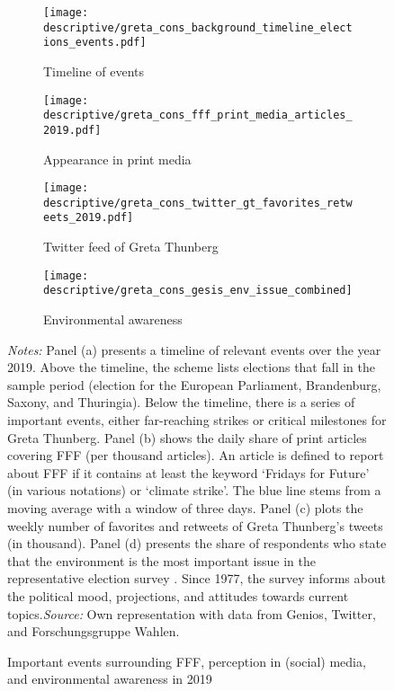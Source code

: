 \begin{landscape}
	\vspace*{\fill}
	\begin{figure}[H]\centering
		\begin{subfigure}[h]{0.85\linewidth}\centering\caption{Timeline of events}\centering
			\texttt{[image: descriptive/greta\_cons\_background\_timeline\_elections\_events.pdf]}
		\end{subfigure}
		
		\par\smallskip %
		\begin{subfigure}[h]{0.29\linewidth}\centering\caption{Appearance in print media}
			\texttt{[image: descriptive/greta\_cons\_fff\_print\_media\_articles\_2019.pdf]}
		\end{subfigure}
		\begin{subfigure}[h]{0.29\linewidth}\centering\caption{Twitter feed of Greta Thunberg}
			\texttt{[image: descriptive/greta\_cons\_twitter\_gt\_favorites\_retweets\_2019.pdf]}
		\end{subfigure}
		\begin{subfigure}[h]{0.29\linewidth}\centering\caption{Environmental awareness}
			\texttt{[image: descriptive/greta\_cons\_gesis\_env\_issue\_combined]}
		\end{subfigure}

		\begin{minipage}{\linewidth}
			\caption{Important events surrounding FFF, perception in (social) media, and environmental awareness in 2019}\label{fig_greta_cons:timeline_media_awareness}
			\scriptsize{\emph{Notes:} Panel (a) presents a timeline of relevant events over the year 2019. Above the timeline, the scheme lists elections that fall in the sample period (election for the European Parliament, Brandenburg, Saxony, and Thuringia). Below the timeline, there is a series of important events, either far-reaching strikes or critical milestones for Greta Thunberg. Panel (b) shows the daily share of print articles covering FFF (per thousand articles). An article is defined to report about FFF if it contains at least the keyword `Fridays for Future' (in various notations) or `climate strike'. The blue line stems from a moving average with a window of three days. Panel (c) plots the weekly number of favorites and retweets of Greta Thunberg's tweets (in thousand). Panel (d) presents the share of respondents who state that the environment is the most important issue in the representative election survey \cite{politbarometer2019}. Since 1977, the survey informs about the political mood, projections, and attitudes towards current topics.\newline \emph{Source:} Own representation with data from Genios, Twitter, and Forschungsgruppe Wahlen.}
		\end{minipage}
	\end{figure}
	\vspace*{\fill}\clearpage
\end{landscape}
\restoregeometry